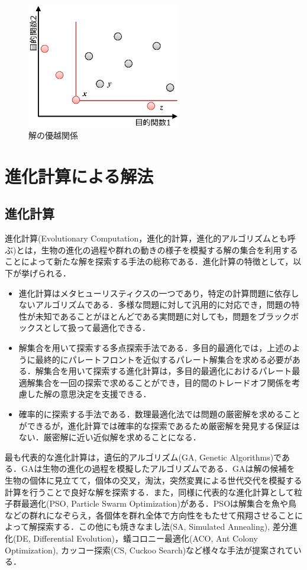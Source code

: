\begin{figure}[htbp]
    \begin{center}
        \includegraphics[width=0.6\textwidth,keepaspectratio=true]{fig/theory_dominate.eps}
    \end{center}
    \caption{解の優越関係}
    \label{fig::theory_dominate}
\end{figure}


\section{進化計算による解法}
\subsection{進化計算}\label{subsec::ec}
進化計算(Evolutionary Computation，進化的計算，進化的アルゴリズムとも呼ぶ)とは，生物の進化の過程や群れの動きの様子を模擬する解の集合を利用することによって新たな解を探索する手法の総称である．進化計算の特徴として，以下が挙げられる．
\begin{itemize}
    \item 進化計算はメタヒューリスティクスの一つであり，特定の計算問題に依存しないアルゴリズムである．多様な問題に対して汎用的に対応でき，問題の特性が未知であることがほとんどである実問題に対しても，問題をブラックボックスとして扱って最適化できる．
    \item 解集合を用いて探索する多点探索手法である．多目的最適化では，上述のように最終的にパレートフロントを近似するパレート解集合を求める必要がある．解集合を用いて探索する進化計算は，多目的最適化におけるパレート最適解集合を一回の探索で求めることができ，目的間のトレードオフ関係を考慮した解の意思決定を支援できる．
    \item 確率的に探索する手法である．数理最適化法では問題の厳密解を求めることができるが，進化計算では確率的な探索であるため厳密解を発見する保証はない．厳密解に近い近似解を求めることになる．
\end{itemize}
最も代表的な進化計算は，遺伝的アルゴリズム(GA, Genetic Algorithms)である．GAは生物の進化の過程を模擬したアルゴリズムである．GAは解の候補を生物の個体に見立てて，個体の交叉，淘汰，突然変異による世代交代を模擬する計算を行うことで良好な解を探索する．また，同様に代表的な進化計算として粒子群最適化(PSO, Particle Swarm Optimization)がある．PSOは解集合を魚や鳥などの群れになぞらえ，各個体を群れ全体で方向性をもたせて飛翔させることによって解探索する．この他にも焼きなまし法(SA, Simulated Annealing), 差分進化(DE, Differential Evolution)，蟻コロニー最適化(ACO, Ant Colony Optimization), カッコー探索(CS, Cuckoo Search)など様々な手法が提案されている．

